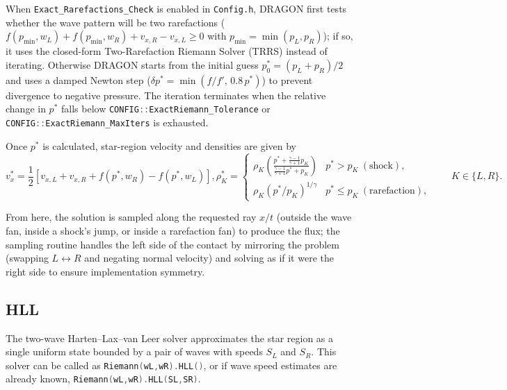 \documentclass[11pt]{report}
\newcommand{\cpp}[1]{\lstinline[language=C++]{#1}}
\newcommand{\bash}[1]{\lstinline[language=bash]{#1}}
\begin{document}
When \cpp{Exact_Rarefactions_Check} is enabled in \bash{Config.h}, DRAGON first tests whether the wave pattern will be two rarefactions ($f(p_{\min}, w_L) + f(p_{\min}, w_R) + v_{x,R} - v_{x,L} \ge 0$ with $p_{\min} = \min(p_L, p_R)$); if so, it uses the closed-form Two-Rarefaction Riemann Solver (TRRS) instead of iterating. 
Otherwise DRAGON starts from the initial guess $p^{*}_0 = (p_L + p_R)/2$ and uses a damped Newton step ($\delta p^{*}= \min(f/f',\, 0.8\,p^{*})$) to prevent divergence to negative pressure. The iteration terminates when the relative change in $p^{*}$ falls below \cpp{CONFIG::ExactRiemann_Tolerance} or \cpp{CONFIG::ExactRiemann_MaxIters} is exhausted.

Once $p^*$ is calculated, star-region velocity and densities are given by
\begin{subequations}
\begin{equation} v_x^{*} = \frac{1}{2}\left[v_{x,L} + v_{x,R} + f(p^{*}, w_R) - f(p^{*}, w_L)\right], \end{equation}
\begin{equation} \rho_K^{*} =
\begin{cases}
\rho_K \left(\frac{p^{*} + \frac{\gamma-1}{\gamma+1}p_K}{\frac{\gamma-1}{\gamma+1}p^{*} + p_K}\right) & p^{*} > p_K \ (\text{shock}), \\[8pt]
\rho_K \left(p^{*}/p_K\right)^{1/\gamma} & p^{*} \le p_K \ (\text{rarefaction}),
\end{cases}
\qquad K \in \{L, R\}.
\end{equation}
\end{subequations}

From here, the solution is sampled along the requested ray $x/t$ (outside the wave fan, inside a shock's jump, or inside a rarefaction fan) to produce the flux; the sampling routine handles the left side of the contact by mirroring the problem (swapping $L \leftrightarrow R$ and negating normal velocity) and solving as if it were the right side to ensure implementation symmetry.


\subsection{HLL}

The two-wave Harten--Lax--van Leer solver approximates the star region as a single uniform state bounded by a pair of waves  with speeds $S_L$ and $S_R$. This solver can be called as \cpp{Riemann(wL,wR).HLL()}, or if wave speed estimates are already known, \cpp{Riemann(wL,wR).HLL(SL,SR)}.
\end{document}
